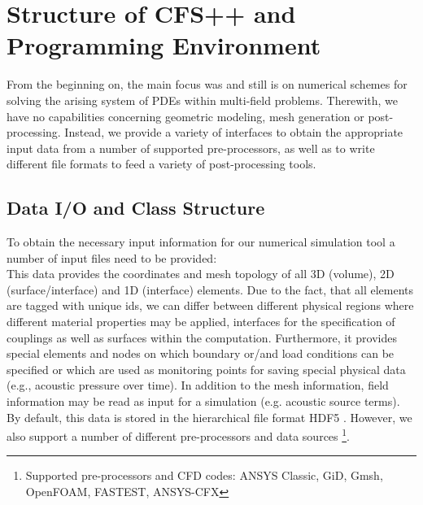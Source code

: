 \section{Structure of CFS++ and Programming Environment}
\label{Sec:CFSstructure}

From the  beginning on, the main focus  was and still is  on numerical schemes
for  solving   the  arising  system  of  PDEs   within  multi-field  problems.
Therewith,  we  have  no  capabilities  concerning  geometric  modeling,  mesh
generation or post-processing. Instead, we  provide a variety of interfaces to
obtain   the   appropriate   input   data   from   a   number   of   supported
pre-processors\footnotemark[1], as well as  to write different file formats to
feed a variety of post-processing tools\footnotemark[2].

\subsection{Data I/O and Class Structure }
\noindent
To obtain the necessary input information for our numerical simulation
tool a number of input files need to be provided: \\


  This data provides  the coordinates and
mesh topology  of all 3D  (volume), 2D (surface/interface) and  1D (interface)
elements. Due  to the fact, that all  elements are tagged with  unique ids, we
can  differ  between  different  physical  regions  where  different  material
properties may  be applied, interfaces  for the specification of  couplings as
well  as surfaces within  the computation.   Furthermore, it  provides special
elements and nodes  on which boundary or/and load  conditions can be specified
or which are used as monitoring points for saving special physical data (e.g.,
acoustic  pressure over  time).  In  addition to  the mesh  information, field
information  may be  read  as input  for  a simulation  (e.g. acoustic  source
terms).  By default, this data is  stored in the hierarchical file format HDF5
\cite{hdf5}. However, we also support a number of different pre-processors and
data  sources  \footnote[1]{Supported  pre-processors  and  CFD  codes:  ANSYS
Classic, GiD, Gmsh, OpenFOAM, FASTEST, ANSYS-CFX}. \\

